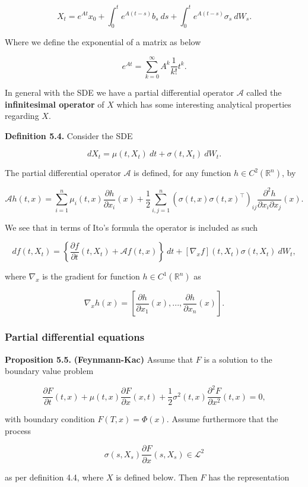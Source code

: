 \documentclass[
]{article}
\begin{document}
\[
X_t=e^{At}x_0+\int_0^te^{A(t-s)}b_s\ ds+\int_0^te^{A(t-s)}\sigma_s\ dW_s.
\]

Where we define the exponential of a matrix as below

\[
e^{At}=\sum_{k=0}^\infty A^k\frac{1}{k!}t^k.
\]

In general with the SDE we have a partial differential operator
\(\mathcal{A}\) called the \textbf{infinitesimal operator} of \(X\)
which has some interesting analytical properties regarding \(X\).

\textbf{Definition 5.4.} Consider the SDE

\[
dX_t=\mu(t,X_t)\ dt+\sigma(t,X_t)\ dW_t.
\]

The partial differential operator \(\mathcal{A}\) is defined, for any
function \(h\in C^2(\mathbb{R}^n)\), by

\[
\mathcal{A}h(t,x)=\sum_{i=1}^n\mu_i(t,x)\frac{\partial h}{\partial x_i}(x) + \frac{1}{2}\sum_{i,j=1}^n (\sigma(t,x)\sigma(t,x)^\top)_{ij}\frac{\partial^2h}{\partial x_i\partial x_j}(x).
\]

We see that in terms of Ito's formula the operator is included as such

\[
df(t,X_t)=\left\{\frac{\partial f}{\partial t}(t,X_t)+\mathcal{A}f(t,x)\right\}\ dt+[\nabla_xf](t,X_t)\sigma(t,X_t)\ dW_t,
\]

where \(\nabla_x\) is the gradient for function
\(h\in C^1(\mathbb{R}^n)\) as

\[
\nabla_xh(x)=\left[\frac{\partial h}{\partial x_1}(x),...,\frac{\partial h}{\partial x_n}(x)\right].
\]

\hypertarget{partial-differential-equations}{%
\subsubsection{Partial differential
equations}\label{partial-differential-equations}}

\textbf{Proposition 5.5.} \textbf{(Feynmann-Kac)} Assume that \(F\) is a
solution to the boundary value problem

\[
\frac{\partial F}{\partial t}(t,x)+\mu(t,x)\frac{\partial F}{\partial x}(x,t)+\frac{1}{2}\sigma^2(t,x)\frac{\partial^2 F}{\partial x^2}(t,x)=0,
\]

with boundary condition \(F(T,x)=\Phi(x)\). Assume furthermore that the
process

\[
\sigma(s,X_s)\frac{\partial F}{\partial x}(s,X_s) \in \mathcal{L}^2
\]

as per definition 4.4, where \(X\) is defined below. Then \(F\) has the
representation
\end{document}

